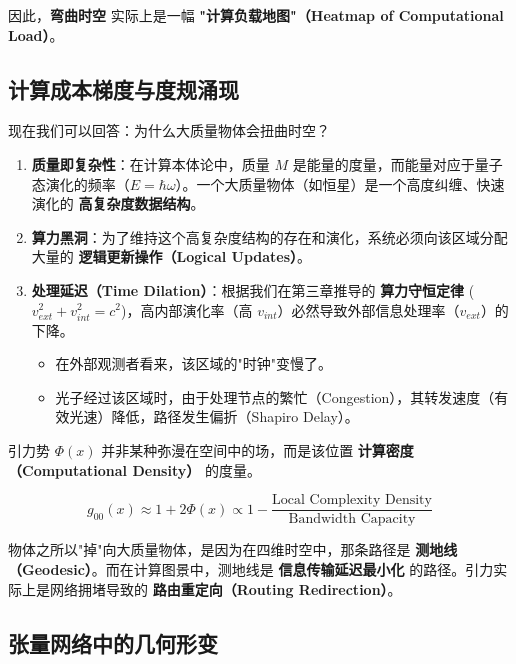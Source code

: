 因此，\textbf{弯曲时空} 实际上是一幅 \textbf{"计算负载地图"（Heatmap of Computational Load）}。

\subsection{计算成本梯度与度规涌现}

现在我们可以回答：为什么大质量物体会扭曲时空？

\begin{enumerate}
\item \textbf{质量即复杂性}：在计算本体论中，质量 $M$ 是能量的度量，而能量对应于量子态演化的频率（$E = \hbar \omega$）。一个大质量物体（如恒星）是一个高度纠缠、快速演化的 \textbf{高复杂度数据结构}。

\item \textbf{算力黑洞}：为了维持这个高复杂度结构的存在和演化，系统必须向该区域分配大量的 \textbf{逻辑更新操作（Logical Updates）}。

\item \textbf{处理延迟（Time Dilation）}：根据我们在第三章推导的 \textbf{算力守恒定律} ($v_{ext}^2 + v_{int}^2 = c^2$)，高内部演化率（高 $v_{int}$）必然导致外部信息处理率（$v_{ext}$）的下降。

\begin{itemize}
\item 在外部观测者看来，该区域的"时钟"变慢了。

\item 光子经过该区域时，由于处理节点的繁忙（Congestion），其转发速度（有效光速）降低，路径发生偏折（Shapiro Delay）。
\end{itemize}
\end{enumerate}

\begin{corollary}[引力势的计算定义]
引力势 $\Phi(x)$ 并非某种弥漫在空间中的场，而是该位置 \textbf{计算密度（Computational Density）} 的度量。

\begin{equation}
g_{00}(x) \approx 1 + 2\Phi(x) \propto 1 - \frac{\text{Local Complexity Density}}{\text{Bandwidth Capacity}}
\end{equation}
\end{corollary}

物体之所以"掉"向大质量物体，是因为在四维时空中，那条路径是 \textbf{测地线（Geodesic）}。而在计算图景中，测地线是 \textbf{信息传输延迟最小化} 的路径。引力实际上是网络拥堵导致的 \textbf{路由重定向（Routing Redirection）}。

\subsection{张量网络中的几何形变}

